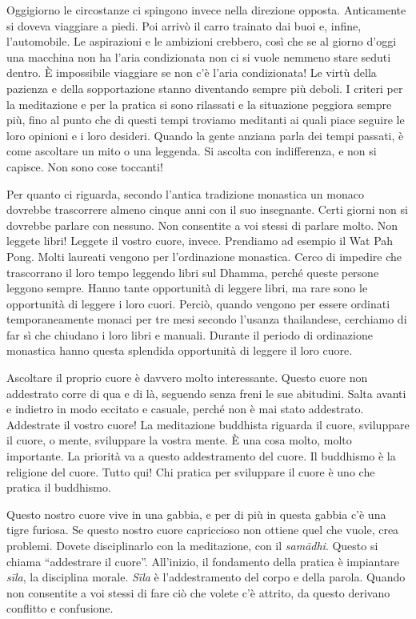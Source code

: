 Oggigiorno le circostanze ci spingono invece nella direzione opposta.
Anticamente si doveva viaggiare a piedi. Poi arrivò il carro trainato
dai buoi e, infine, l'automobile. Le aspirazioni e le ambizioni
crebbero, così che se al giorno d'oggi una macchina non ha l'aria
condizionata non ci si vuole nemmeno stare seduti dentro. È impossibile
viaggiare se non c'è l'aria condizionata! Le virtù della pazienza e
della sopportazione stanno diventando sempre più deboli. I criteri per
la meditazione e per la pratica si sono rilassati e la situazione
peggiora sempre più, fino al punto che di questi tempi troviamo
meditanti ai quali piace seguire le loro opinioni e i loro desideri.
Quando la gente anziana parla dei tempi passati, è come ascoltare un
mito o una leggenda. Si ascolta con indifferenza, e non si capisce. Non
sono cose toccanti!

Per quanto ci riguarda, secondo l'antica tradizione monastica un monaco
dovrebbe trascorrere almeno cinque anni con il suo insegnante. Certi
giorni non si dovrebbe parlare con nessuno. Non consentite a voi stessi
di parlare molto. Non leggete libri! Leggete il vostro cuore, invece.
Prendiamo ad esempio il Wat Pah Pong. Molti laureati vengono per
l'ordinazione monastica. Cerco di impedire che trascorrano il loro tempo
leggendo libri sul Dhamma, perché queste persone leggono sempre. Hanno
tante opportunità di leggere libri, ma rare sono le opportunità di
leggere i loro cuori. Perciò, quando vengono per essere ordinati
temporaneamente monaci per tre mesi secondo l'usanza thailandese,
cerchiamo di far sì che chiudano i loro libri e manuali. Durante il
periodo di ordinazione monastica hanno questa splendida opportunità di
leggere il loro cuore.

Ascoltare il proprio cuore è davvero molto interessante. Questo cuore
non addestrato corre di qua e di là, seguendo senza freni le sue
abitudini. Salta avanti e indietro in modo eccitato e casuale, perché
non è mai stato addestrato. Addestrate il vostro cuore! La meditazione
buddhista riguarda il cuore, sviluppare il cuore, o mente, sviluppare la
vostra mente. È una cosa molto, molto importante. La priorità va a
questo addestramento del cuore. Il buddhismo è la religione del cuore.
Tutto qui! Chi pratica per sviluppare il cuore è uno che pratica il
buddhismo.

Questo nostro cuore vive in una gabbia, e per di più in questa gabbia
c'è una tigre furiosa. Se questo nostro cuore capriccioso non ottiene
quel che vuole, crea problemi. Dovete disciplinarlo con la meditazione,
con il \emph{samādhi}. Questo si chiama ``addestrare il cuore''.
All'inizio, il fondamento della pratica è impiantare \emph{sīla}, la
disciplina morale. \emph{Sīla} è l'addestramento del corpo e della
parola. Quando non consentite a voi stessi di fare ciò che volete c'è
attrito, da questo derivano conflitto e confusione.

